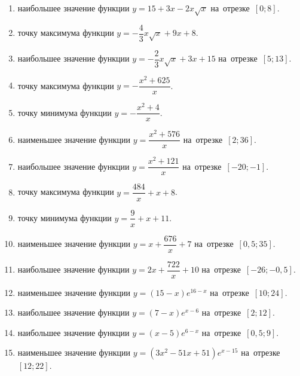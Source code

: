 \documentclass[a4paper,10pt]{article}
\begin{document}
\begin{enumerate}
\item {} наибольшее значение функции $y=15+3x -2x\sqrt{x}$ на~отрезке~$\left[0;8\right]$.

\item {} точку максимума функции $y=-\dfrac{4}{3}x\sqrt{x} +9x+8$.

\item {} наибольшее значение функции $y=-\dfrac{2}{3}x\sqrt{x} +3x+15$ на~отрезке~$\left[5;13\right]$.

\item {} точку максимума функции $y=-\dfrac{x^2 +625}{x}$.

\item {} точку минимума функции $y=-\dfrac{x^2 +4}{x}$.

\item {} наименьшее значение функции $y=\dfrac{x^2 +576}{x}$ на~отрезке~$\left[2;36\right]$.

\item {} наибольшее значение функции $y=\dfrac{x^2 +121}{x}$ на~отрезке~$\left[-20;-1\right]$.

\item {} точку максимума функции $y=\dfrac{484}{x} +x+8$.

\item {} точку минимума функции $y=\dfrac{9}{x} +x+11$.

\item {} наименьшее значение функции $y=x+\dfrac{676}{x} +7$ на~отрезке~$\left[0,5;35\right]$.

\item {} наибольшее значение функции $y=2x+\dfrac{722}{x} +10$ на~отрезке~$\left[-26;-0,5\right]$.

\item {} наименьшее значение функции $y=\left(15-x\right)e^{16-x}$ на~отрезке~$\left[10;24\right]$.

\item {} наибольшее значение функции $y=\left(7-x\right)e^{x-6}$ на~отрезке~$\left[2;12\right]$.

\item {} наибольшее значение функции $y=\left(x-5\right)e^{6-x}$ на~отрезке~$\left[0,5;9\right]$.

\item {} наименьшее значение функции $y=\left(3x^2 -51x +51\right)e^{x -15}$ на~отрезке~$\left[12;22\right]$.


\end{enumerate}
\end{document}
